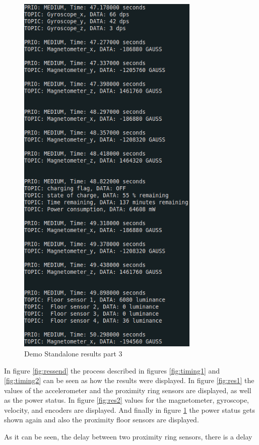 \documentclass[12pt]{report}%
\begin{document}
\begin{figure}[ht]
	\centering
	\includegraphics[width=\textwidth, height=18cm]{standalone_3}
  	\caption{Demo Standalone results part 3}
  	\label{fig:res3}
\end{figure}

In figure \ref{fig:ressend} the process described in figures \ref{fig:timing1} and \ref{fig:timing2} can be seen as how the results were displayed. In figure \ref{fig:res1} the values of the accelerometer and the proximity ring sensors are displayed, as well as the power status. In figure \ref{fig:res2} values for the magnetometer, gyroscope, velocity, and encoders are displayed. And finally in figure \ref{fig:res3} the power status gets shown again and also the proximity floor sensors are displayed.

As it can be seen, the delay between two proximity ring sensors, there is a delay


\end{document}
